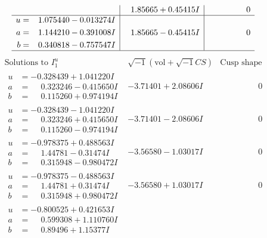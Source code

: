 \documentclass[1p]{elsarticle_modified}
\theoremstyle{definition}
\newcommand{\I}{\sqrt{-1}}
\begin{document}
$$\begin{array}{c|c|c}
 & \phantom{-}1.85665 + 0.45415 I & \phantom{-0.000000 } 0 \\ \hline\begin{aligned}
u &= \phantom{-}1.075440 - 0.013274 I \\
a &= \phantom{-}1.144210 - 0.391008 I \\
b &= \phantom{-}0.340818 - 0.757547 I\end{aligned}
 & \phantom{-}1.85665 - 0.45415 I & \phantom{-0.000000 } 0\\
 \hline 
 \end{array}$$\newpage$$\begin{array}{c|c|c}  
\text{Solutions to }I^u_{1}& \I (\text{vol} + \sqrt{-1}CS) & \text{Cusp shape}\\
 \hline 
\begin{aligned}
u &= -0.328439 + 1.041220 I \\
a &= \phantom{-}0.323246 - 0.415650 I \\
b &= \phantom{-}0.115260 + 0.974194 I\end{aligned}
 & -3.71401 + 2.08606 I & \phantom{-0.000000 } 0 \\ \hline\begin{aligned}
u &= -0.328439 - 1.041220 I \\
a &= \phantom{-}0.323246 + 0.415650 I \\
b &= \phantom{-}0.115260 - 0.974194 I\end{aligned}
 & -3.71401 - 2.08606 I & \phantom{-0.000000 } 0 \\ \hline\begin{aligned}
u &= -0.978375 + 0.488563 I \\
a &= \phantom{-}1.44781 - 0.31474 I \\
b &= \phantom{-}0.315948 - 0.980472 I\end{aligned}
 & -3.56580 - 1.03017 I & \phantom{-0.000000 } 0 \\ \hline\begin{aligned}
u &= -0.978375 - 0.488563 I \\
a &= \phantom{-}1.44781 + 0.31474 I \\
b &= \phantom{-}0.315948 + 0.980472 I\end{aligned}
 & -3.56580 + 1.03017 I & \phantom{-0.000000 } 0 \\ \hline\begin{aligned}
u &= -0.800525 + 0.421653 I \\
a &= \phantom{-}0.599308 + 1.110760 I \\
b &= \phantom{-}0.89496 + 1.15377 I\end{aligned}

\end{array}$$
\end{document}
